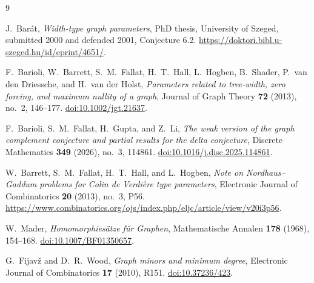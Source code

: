 \documentclass[11pt]{article}
\begin{document}
\begin{thebibliography}{9}
\footnotesize
\raggedright

J.~Bar\'at,
\emph{Width-type graph parameters},
PhD thesis, University of Szeged, submitted 2000 and defended 2001,
Conjecture 6.2.
\url{https://doktori.bibl.u-szeged.hu/id/eprint/4651/}.

F.~Barioli, W.~Barrett, S.~M.~Fallat, H.~T.~Hall, L.~Hogben, B.~Shader,
P.~van den Driessche, and H.~van der Holst,
\emph{Parameters related to tree-width, zero forcing, and maximum nullity of a graph},
Journal of Graph Theory \textbf{72} (2013), no.~2, 146--177.
\href{https://doi.org/10.1002/jgt.21637}{doi:10.1002/jgt.21637}.

F.~Barioli, S.~M.~Fallat, H.~Gupta, and Z.~Li,
\emph{The weak version of the graph complement conjecture and partial results for the delta conjecture},
Discrete Mathematics \textbf{349} (2026), no.~3, 114861.
\href{https://doi.org/10.1016/j.disc.2025.114861}{doi:10.1016/j.disc.2025.114861}.

W.~Barrett, S.~M.~Fallat, H.~T.~Hall, and L.~Hogben,
\emph{Note on Nordhaus--Gaddum problems for Colin de Verdi\`ere type parameters},
Electronic Journal of Combinatorics \textbf{20} (2013), no.~3, P56.
\url{https://www.combinatorics.org/ojs/index.php/eljc/article/view/v20i3p56}.

W.~Mader,
\emph{Homomorphies\"atze f\"ur Graphen},
Mathematische Annalen \textbf{178} (1968), 154--168.
\href{https://doi.org/10.1007/BF01350657}{doi:10.1007/BF01350657}.

G.~Fijav\v{z} and D.~R.~Wood,
\emph{Graph minors and minimum degree},
Electronic Journal of Combinatorics \textbf{17} (2010), R151.
\href{https://doi.org/10.37236/423}{doi:10.37236/423}.

\end{thebibliography}
\end{document}
